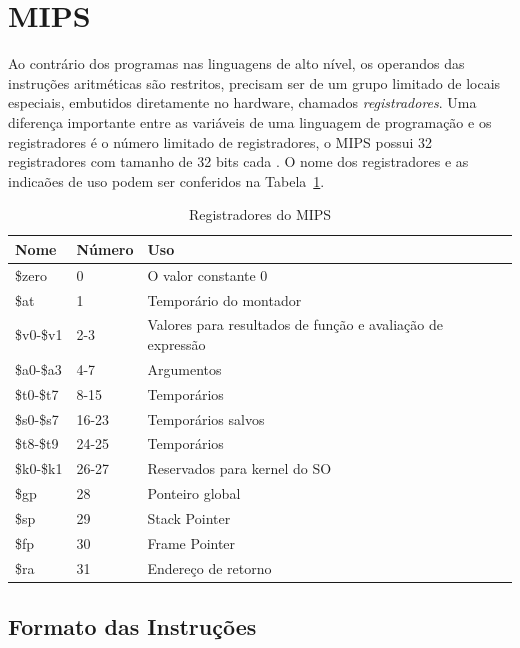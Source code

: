 \section{MIPS} \label{sec_mips}
Ao contrário dos programas nas linguagens de alto nível, os operandos das instruções aritméticas são restritos, precisam ser de um grupo limitado de locais especiais, embutidos diretamente no hardware, chamados \textit{registradores}. Uma diferença importante entre as variáveis de uma linguagem de programação e os registradores é o número limitado de registradores, o MIPS possui 32 registradores com tamanho de 32 bits cada \cite{patterson1}. O nome dos registradores e as indicaões de uso podem ser conferidos na Tabela~{\ref{tab:tabela-mips-001}}.

\begin{table}[b]
\caption {Registradores do MIPS}
\begin{center}
\begin{tabularx}{8.4cm}{llX} 
\textbf{Nome} & \textbf{Número} & \textbf{Uso} \\ \hline
\$zero & 0 & O valor constante 0 \\ \hline
\$at & 1 & Temporário do montador\\ \hline
\$v0-\$v1 & 2-3 & Valores para resultados de função e avaliação de expressão\\ \hline
\$a0-\$a3 & 4-7 & Argumentos \\ \hline
\$t0-\$t7 & 8-15 & Temporários \\ \hline
\$s0-\$s7 & 16-23 & Temporários salvos \\ \hline
\$t8-\$t9 & 24-25 & Temporários \\ \hline
\$k0-\$k1 & 26-27 & Reservados para kernel do SO \\ \hline
\$gp & 28 & Ponteiro global \\ \hline
\$sp & 29 & Stack Pointer \\ \hline
\$fp & 30 & Frame Pointer \\ \hline
\$ra & 31 & Endereço de retorno \\ \hline
\end{tabularx}
\end{center}
\label{tab:tabela-mips-001}
\end{table}

\subsection{Formato das Instruções}

